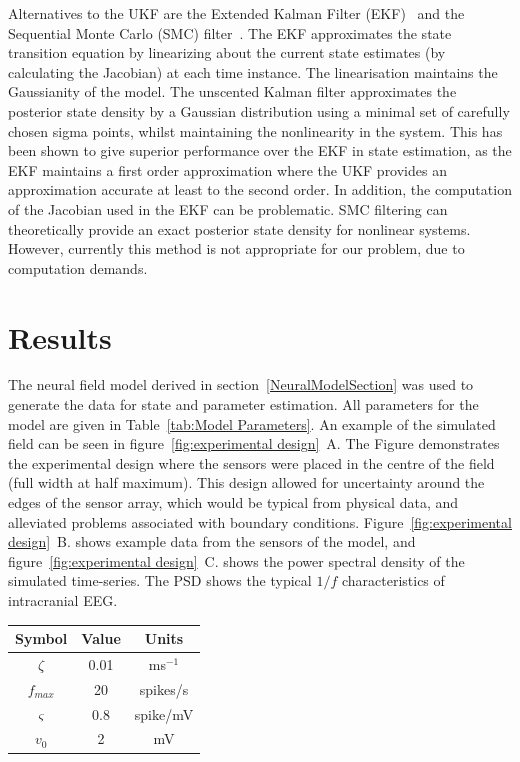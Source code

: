 \documentclass[twocolumn,11pt,a4paper]{article}		%
\begin{document}
Alternatives to the UKF are the Extended Kalman Filter (EKF)~\cite{Haykin2001} and the Sequential Monte Carlo (SMC) filter~\cite{doucet2001}. The EKF approximates the state transition equation by linearizing about the current state estimates (by calculating the Jacobian) at each time instance. The linearisation maintains the Gaussianity of the model. The unscented Kalman filter approximates the posterior state density by a Gaussian distribution using a minimal set of carefully chosen sigma points, whilst maintaining the nonlinearity in the system. This has been shown to give superior performance over the EKF in state estimation, as the EKF maintains a first order approximation where the UKF provides an approximation accurate at least to the second order. In addition, the computation of the Jacobian used in the EKF can be problematic. SMC filtering can theoretically provide an exact posterior state density for nonlinear systems. However, currently this method is not appropriate for our problem, due to computation demands. 

\section{Results}\label{ResultsSection} The neural field model derived in section~\ref{NeuralModelSection} was used to generate the data for state and parameter estimation. All parameters for the model are given in Table~\ref{tab:Model Parameters}. An example of the simulated field can be seen in figure~\ref{fig:experimental design}~A. The Figure demonstrates the experimental design where the sensors were placed in the centre of the field (full width at half maximum). This design allowed for uncertainty around the edges of the sensor array, which would be typical from physical data, and alleviated problems associated with boundary conditions. Figure~\ref{fig:experimental design}~B. shows example data from the sensors of the model, and figure~\ref{fig:experimental design}~C. shows the power spectral density of the simulated time-series. The PSD shows the typical $1/f$ characteristics of intracranial EEG.

\begin{center}
\begin{tabular}{c|c|c}	
	\hline\hline Symbol & Value & Units \\
	\hline\hline
	$\zeta$ & 0.01 & ms$^{-1}$\\
	$f_{max}$ & 20 & spikes/s \\
	$\varsigma$ & 0.8 & spike/mV\\
	$v_0$ & 2 & mV\\
	\hline\hline
\end{tabular}\label{tab:Model Parameters}
\end{center}
\end{document}
